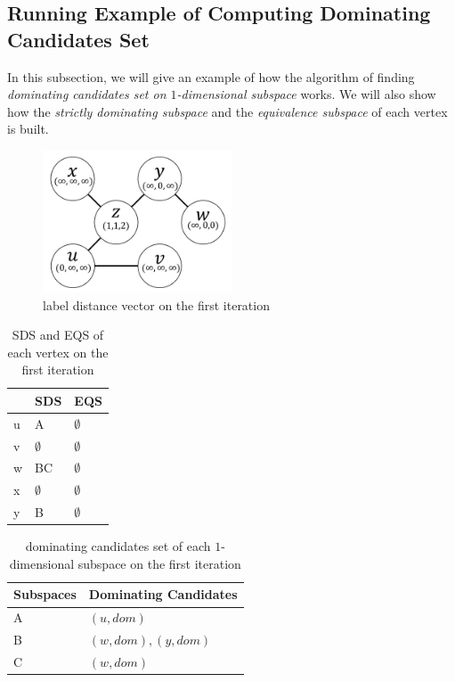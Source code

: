 \subsection{Running Example of Computing Dominating Candidates Set}

In this subsection, we will give an example of how the algorithm of finding \emph{dominating candidates set on $1$-dimensional subspace} works. We will also show how the \emph{strictly dominating subspace} and the \emph{equivalence subspace} of each vertex is built.

\begin{figure}[H]
    \centering
    \includegraphics[width=0.5\textwidth]{figs/graph_example_1}
    \caption{\label{font-figure}label distance vector on the first iteration}
    \label{fig:cand_step1}
\end{figure}

\begin{table}[H]
    \centering
    \begin{tabular}{|l|l|l|}
    \hline
      & SDS         & EQS         \\ \hline
    u & A           & $\emptyset$ \\ \hline
    v & $\emptyset$ & $\emptyset$ \\ \hline
    w & BC          & $\emptyset$ \\ \hline
    x & $\emptyset$ & $\emptyset$ \\ \hline
    y & B           & $\emptyset$ \\ \hline
    \end{tabular}
    \caption{\label{font-table}SDS and EQS of each vertex on the first iteration}
    \label{tab:sds_step1}
\end{table}

\begin{table}[H]
    \centering

    \begin{tabular}{|l|l|}
    \hline
    Subspaces & Dominating Candidates \\ \hline
    A         & $(u, dom)$            \\ \hline
    B         & $(w, dom), (y, dom)$            \\ \hline
    C         & $(w, dom)$            \\ \hline
    \end{tabular}
    \caption{\label{font-table}dominating candidates set of each $1$-dimensional subspace on the first iteration}
    \label{tab:cand_set_step1}
\end{table}

